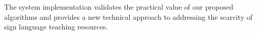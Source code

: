 \begin{abstract*}
The system implementation validates the practical value of our proposed algorithms and provides a new technical approach to addressing the scarcity of sign language teaching resources.

\end{abstract*}
